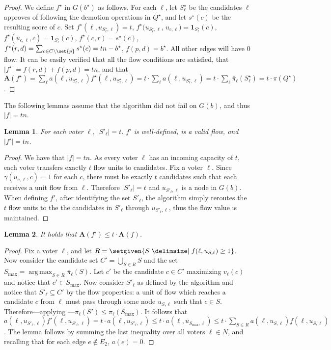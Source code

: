 \documentclass[letterpaper]{article} %
\DeclareMathOperator*{\argmax}{arg\,max}
\newtheorem{lemma}{Lemma}
\newcommand{\indic}{\mathbf{1}}
\newcommand{\vecc}{\mathbf}
\newcommand{\Cmp}{C \setminus \set{p}}
\newcommand{\abs}[1]{\lvert{#1}\rvert}
\newcommand{\Aoper}[1]{\vecc{A}({#1})}
\begin{document}
\begin{proof}
 We define $f^\star$ in $G(b^\star)$ as follows. For each $\ell$, let $S^\star_\ell$ be the candidates $\ell$ approves of following the demotion operations in $Q^\star$, and let $s^\star(c)$ be the resulting score of $c$. Set $f^\star(\ell, u_{S^\star_\ell,\ell}) = t$, $f^\star(u_{S^\star_\ell,\ell}$, $u_{c,\ell}) = \indic_{S^\star_{\ell}}(c)$, $f^\star(u_{c,\ell},c) = \indic_{S^\star_{\ell}}(c)$, $f^\star(c,r) = s^\star(c)$, $f^\star(r,d)=\sum_{c \in \Cmp}s^\star(c)=tn-b^\star$,  $f(p,d)=b^\star$. All other edges will have $0$ flow. It can be easily verified that all the flow conditions are satisfied, that $\abs{f^\star} = f(r,d)+f(p,d) = tn$, and that $\Aoper{f^\star} =  \sum_{\ell}a(\ell, u_{S^\star_\ell, \ell})f^\star(\ell, u_{S^\star_\ell, \ell})= t \cdot \sum_{\ell}a(\ell, u_{S^\star_\ell, \ell}) =  t \cdot \sum_{\ell}\bar{\pi}_{\ell}(S^\star_\ell)= t\cdot \pi(Q^\star)$.
\end{proof}
The following lemmas assume that the algorithm did not fail on $G(b)$, and thus $\abs{f} = tn$.
\begin{lemma}
For each voter $\ell$, $\abs{S'_\ell}=t$. $f'$ is well-defined, is a valid flow, and  $\abs{f'} = tn$.
\end{lemma}
\begin{proof}
We have that $\abs{f} = tn$. As every voter $\ell$ has an incoming capacity of $t$, each voter transfers exactly $t$ flow units to candidates.
Fix a voter $\ell$. Since $\gamma(u_{c,\ell},c) = 1$ for each $c$, there must be exactly $t$ candidates
such that each receives a unit flow from $\ell$. Therefore $\abs{S'_\ell}=t$ and $u_{S'_\ell, \ell}$ is a node in $G(b)$. When defining $f'$, after identifying the set $S'_\ell$, the algorithm simply reroutes the $t$ flow units to the the candidates in $S'_\ell$ through $u_{S'_\ell, \ell}$, thus the flow value is maintained.
\end{proof}
\begin{lemma} \label{totalPriceLemma}
It holds that $\Aoper{f'} \leq t \cdot \Aoper{f}$.
\end{lemma}
\begin{proof}
Fix a voter $\ell$, and let $R=\setgiven{S \given  f(\ell, u_{S, \ell})\geq 1}$. Now consider the candidate set $C' = \bigcup_{S \in R}S$ and the set $S_{\max}=\argmax_{S\in R} \bar{\pi}_{\ell}(S)$. Let $c'$ be the candidate $c \in C'$ maximizing $v_\ell(c)$ and notice that $c' \in S_{\max}$. Now consider $S'_{\ell}$ as defined by the algorithm and notice that $S'_{\ell} \subseteq C'$ by the flow properties: a unit of flow which reaches a candidate $c$ from $\ell$ must pass through some node $u_{S,\ell}$ such that $c \in S$. Therefore---applying ---$\bar{\pi}_{\ell}(S') \leq \bar{\pi}_{\ell}(S_{\max})$.
It follows that $a(\ell, u_{S'_\ell, \ell})f'(\ell, u_{S'_\ell, \ell}) =t \cdot a(\ell, u_{S'_\ell, \ell})  \leq t\cdot  a(\ell, u_{S_{\max}, \ell}) \leq
t\cdot \sum_{S \in R}a(\ell, u_{S, \ell}) f(\ell, u_{S, \ell})$.
The lemma follows by summing the last inequality over all voters $\ell \in N$, and recalling that for each edge $e \notin E_2$, $a(e)=0$.
\end{proof}
\end{document}

